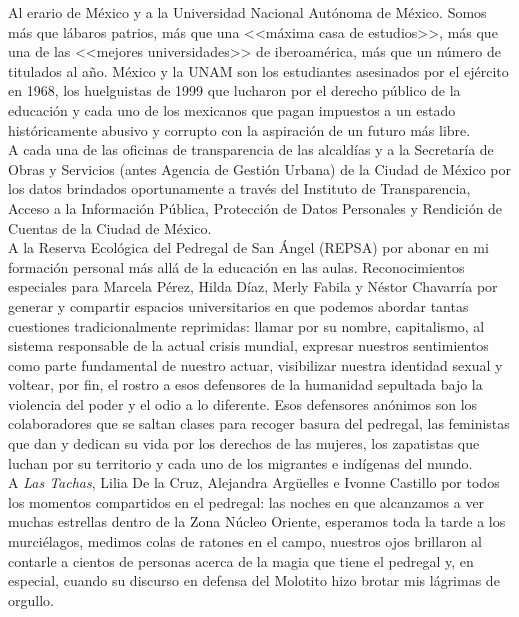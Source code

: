 Al erario de México y a la Universidad Nacional Autónoma de México. Somos más que lábaros patrios, más que una <<máxima casa de estudios>>, más que una de las <<mejores universidades>> de iberoamérica, más que un número de titulados al año. México y la UNAM son los estudiantes asesinados por el ejército en 1968, los huelguistas de 1999 que lucharon por el derecho público de la educación y cada uno de los mexicanos que pagan impuestos a un estado históricamente abusivo y corrupto con la aspiración de un futuro más libre.\\

A cada una de las oficinas de transparencia de las alcaldías y a la Secretaría de Obras y Servicios (antes Agencia de Gestión Urbana) de la Ciudad de México  por los datos brindados oportunamente a través del Instituto de Transparencia, Acceso a la Información Pública, Protección de Datos Personales y Rendición de Cuentas de la Ciudad de México.\\

A la Reserva Ecológica del Pedregal de San Ángel (REPSA) por abonar en mi formación personal más allá de la educación en las aulas. Reconocimientos especiales para Marcela Pérez, Hilda Díaz, Merly Fabila y Néstor Chavarría por generar y compartir espacios universitarios en que podemos abordar tantas cuestiones tradicionalmente reprimidas: llamar por su nombre, capitalismo, al sistema responsable de la actual crisis mundial, expresar nuestros sentimientos como parte fundamental de nuestro actuar, visibilizar nuestra identidad sexual y voltear, por fin, el rostro a esos defensores de la humanidad sepultada bajo la violencia del poder y el odio a lo diferente. Esos defensores anónimos son los colaboradores que se saltan clases para recoger basura del pedregal, las feministas que dan y dedican su vida por los derechos de las mujeres, los zapatistas que luchan por su territorio y cada uno de los migrantes e indígenas del mundo.\\

A \textit{Las Tachas}, Lilia De la Cruz, Alejandra Argüelles e Ivonne Castillo por todos los momentos compartidos en el pedregal: las noches en que alcanzamos a ver muchas estrellas dentro de la Zona Núcleo Oriente, esperamos toda la tarde a los murciélagos, medimos colas de ratones en el campo, nuestros ojos brillaron al contarle a cientos de personas acerca de la magia que tiene el pedregal y, en especial, cuando su discurso en defensa del Molotito hizo brotar mis lágrimas de orgullo.\\ 

